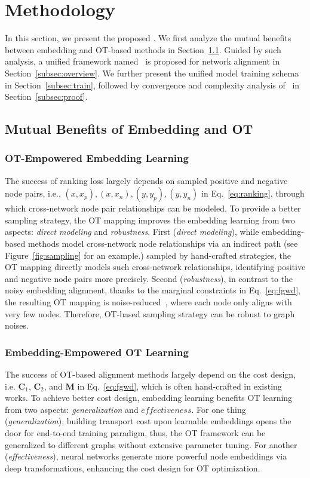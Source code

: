 \vspace{-5pt}
\section{Methodology}\label{sec:method}

In this section, we present the proposed \algname. We first analyze the mutual benefits between embedding and OT-based methods in Section~\ref{subsec:analysis}. Guided by such analysis, a unified framework named \algname\ is proposed for network alignment in Section~\ref{subsec:overview}. We further present the unified model training schema in Section~\ref{subsec:train}, followed by convergence and complexity analysis of \algname\ in Section~\ref{subsec:proof}.

\vspace{-2pt}
\subsection{Mutual Benefits of Embedding and OT}\label{subsec:analysis}
\subsubsection{OT-Empowered Embedding Learning}
The success of ranking loss largely depends on sampled positive and negative node pairs, i.e., $(x,x_p),(x,x_n),(y,y_p),(y,y_n)$ in Eq.~\eqref{eq:ranking}, through which cross-network node pair relationships can be modeled.
To provide a better sampling strategy, the OT mapping improves the embedding learning from two aspects: \textit{direct modeling} and \textit{robustness}.
First (\textit{direct modeling}), while embedding-based methods model cross-network node relationships via an indirect path (see Figure~\ref{fig:sampling} for an example.) sampled by hand-crafted strategies, the OT mapping directly models such cross-network relationships, identifying positive and negative node pairs more precisely.
Second (\textit{robustness}), in contrast to the noisy embedding alignment, thanks to the marginal constraints in Eq.~\eqref{eq:fgwd}, the resulting OT mapping is noise-reduced~\cite{parrot,tam2019optimal}, where each node only aligns with very few nodes.
Therefore,  OT-based sampling strategy can be robust to graph noises.

\subsubsection{Embedding-Empowered OT Learning}
The success of OT-based alignment methods largely depend on the cost design, i.e. $\mathbf{C}_1$, $\mathbf{C}_2$, and $\mathbf{M}$ in Eq.~\eqref{eq:fgwd}, which is often hand-crafted in existing works.
To achieve better cost design, embedding learning benefits OT learning from two aspects: \textit{generalization} and $\textit{effectiveness}$.
For one thing (\textit{generalization}), building transport cost upon learnable embeddings opens the door for end-to-end training paradigm, thus, the OT framework can be generalized to different graphs without extensive parameter tuning. For another (\textit{effectiveness}), neural networks generate more powerful node embeddings via deep transformations, enhancing the cost design for OT optimization.

